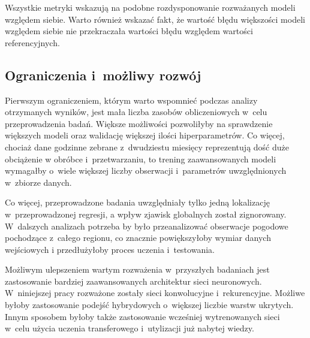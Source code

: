 Wszystkie metryki wskazują na podobne rozdysponowanie rozważanych modeli względem siebie. Warto również wskazać
fakt, że wartość błędu większości modeli względem siebie nie przekraczała wartości błędu względem wartości
referencyjnych.



\subsection{Ograniczenia i~możliwy rozwój}

Pierwszym ograniczeniem, którym warto wspomnieć podczas analizy otrzymanych wyników, jest 
mała liczba zasobów obliczeniowych w~celu przeprowadzenia badań. Większe możliwości pozwoliłyby
na sprawdzenie większych modeli oraz walidację większej ilości hiperparametrów. Co więcej, 
chociaż dane godzinne zebrane z~dwudziestu miesięcy reprezentują dość duże obciążenie
w obróbce i~przetwarzaniu, to trening zaawansowanych modeli wymagałby o~wiele większej liczby 
obserwacji i~parametrów uwzględnionych w~zbiorze danych.

Co więcej, przeprowadzone badania uwzględniały tylko jedną lokalizację w~przeprowadzonej regresji,
a wpływ zjawisk globalnych został zignorowany. W~dalszych analizach potrzeba by było przeanalizować
obserwacje pogodowe pochodzące z~całego regionu, co znacznie powiększyłoby wymiar danych wejściowych
i przedłużyłoby proces uczenia i~testowania.

Możliwym ulepszeniem wartym rozważenia w~przyszłych badaniach jest zastosowanie bardziej zaawansowanych
architektur sieci neuronowych. W~niniejszej pracy rozważone zostały sieci konwolucyjne i~rekurencyjne.
Możliwe byłoby zastosowanie podejść hybrydowych o~większej liczbie warstw ukrytych. Innym sposobem
byłoby także zastosowanie wcześniej wytrenowanych sieci w~celu użycia uczenia transferowego i~utylizacji
już nabytej wiedzy.

